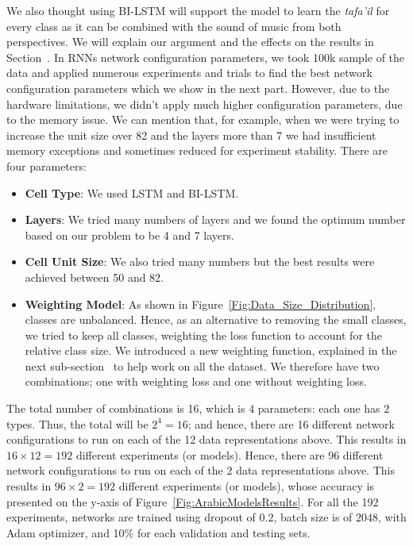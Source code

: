 We also thought using BI-LSTM will support the model to learn the \textit{tafa'il} for every class as it can be combined with the sound of music from both perspectives. We will explain our argument and the effects on the results in Section~. In RNNs network configuration parameters, we took 100k sample of the data and applied numerous experiments and trials to find the best network configuration parameters which we show in the next part. However, due to the hardware limitations, we didn’t apply much higher configuration parameters, due to the memory issue. We can mention that, for example, when we were trying to increase the unit size over 82 and the layers more than 7 we had insufficient memory exceptions and sometimes reduced for experiment stability. There are four parameters:
\begin{itemize}
\item \textbf{Cell Type}: We used LSTM and BI-LSTM.
\item \textbf{Layers}: We tried many numbers of layers and we found the optimum number based on our problem to be 4 and 7 layers.
\item \textbf{Cell Unit Size}: We also tried many numbers but the best results were achieved between 50 and 82.
\item \textbf{Weighting Model}: As shown in Figure~\ref{Fig:Data_Size_Distribution}, classes are unbalanced. Hence, as an alternative to removing the small classes, we tried to keep all classes, weighting the loss function to account for the relative class size. We introduced a new weighting function, explained in the next sub-section~ to help work on all the dataset. We therefore have two combinations; one with weighting loss and one without weighting loss.
 
 \end{itemize}

The total number of combinations is 16, which is $4$ parameters: each one has $2$ types. Thus, the total will be $2^4=16$; and hence, there are 16 different network configurations to run on each of the 12 data representations above. This results in $16 \times 12 = 192$ different experiments (or models). Hence, there are 96 different network configurations to run on each of the 2 data representations above. This results in $96 \times 2 = 192$ different experiments (or models), whose accuracy is presented on the y-axis of Figure~\ref{Fig:ArabicModelsResults}. For all the 192 experiments, networks are trained using dropout of $0.2$, batch size is of $2048$, with Adam optimizer, and 10\% for each validation and testing sets.

